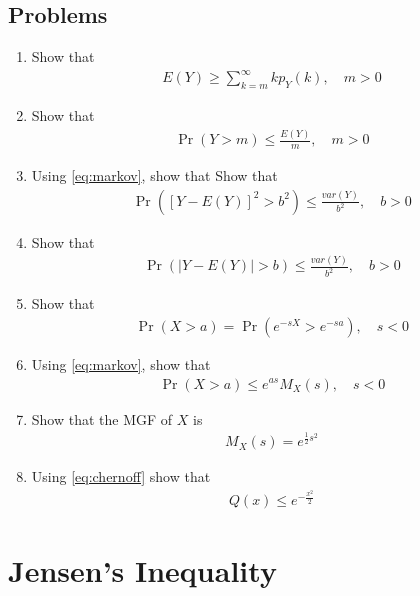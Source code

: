 \documentclass[journal,12pt,onecolumn]{IEEEtran}
\renewcommand\thesection{\arabic{section}}
\renewcommand\thesubsection{\thesection.\arabic{subsection}}
\providecommand{\pr}[1]{\ensuremath{\Pr\left(#1\right)}}
\providecommand{\sbrak}[1]{\ensuremath{{}\left[#1\right]}}
\providecommand{\brak}[1]{\ensuremath{\left(#1\right)}}
\theoremstyle{remark}
\providecommand{\abs}[1]{\left\vert#1\right\vert}
\numberwithin{equation}{section}
\begin{document}
\subsection{Problems}
\begin{enumerate}[label=\arabic*.,ref=\thesubsection.\theenumi]
\item Show that
\begin{align}
	E\brak{Y} \ge \sum_{k=m}^{\infty}kp_{Y}(k), \quad m > 0
\end{align}
\item Show that
\begin{align}
	\pr{Y>m} \le \frac{E\brak{Y}}{ m}, \quad  m > 0
	\label{eq:markov}
\end{align}
\item Using 
	\eqref{eq:markov}, show that 
Show that
\begin{align}
	\pr{\sbrak{Y-E\brak{Y}}^2>b^2} \le \frac{var(Y)}{b^2}, \quad b > 0
\end{align}
\item Show that 
\begin{align}
	\pr{\abs{Y-E\brak{Y}}>b} \le \frac{var(Y)}{b^2}, \quad b > 0
\end{align}
\item Show that 
\begin{align}
	\pr{X > a} = \pr{e^{-sX}> e^{-sa}}, \quad s < 0
\end{align}
\item Using 
	\eqref{eq:markov}, show that 
\begin{align}
	\label{eq:chernoff}
	\pr{X > a}\le e^{as}M_X(s), \quad s < 0
\end{align}
\item Show that the MGF of $X$ is 
\begin{align}
	M_X(s) = e^{\frac{1}{2}s^2}
\end{align}
\item Using 
	\eqref{eq:chernoff}
show that 
\begin{align}
	Q\brak{x} \le e^{-\frac{x^2}{2}}
\end{align}

 \end{enumerate}
%
\section{Jensen's Inequality}
\end{document}
